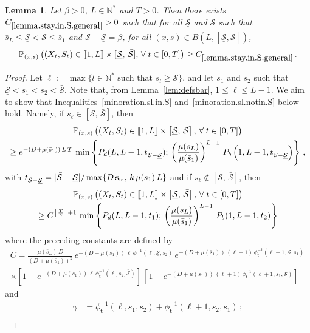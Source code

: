 \documentclass[10pt]{amsart}
\newtheorem{lemm}[theo]{Lemma}\newtheorem{prop}[theo]{Proposition}\newtheorem{coro}[theo]{Corollary}\newtheorem{conj}[theo]{Conjecture}
\theoremstyle{definition}\newtheorem{defi}[theo]{Definition}\newtheorem{rema}[theo]{Remark}\newtheorem{exam}[theo]{Example}\newtheorem{exem}[theo]{Example}\newtheorem{nota}[theo]{Notation}
\newcommand{\llbracket}{\mathopen{[\mkern -2.7mu[}}
\newcommand{\rrbracket}{\mathclose{]\mkern -2.7mu]}}
\newcommand{\PP}{\mathbb{P}}
\newcommand{\NN}{\mathbb{N}}
\newcommand{\Sin}{{\mathbf s}_{\textrm{\tiny\rm in}}}
\newcommand{\Smin}{\underline{\mathcal{S}}}
\newcommand{\Smax}{\bar{\mathcal{S}}}
\newcommand{\barmu}{\mu(\bar s_1)}
\newcommand{\phit}{\phi_\textsf{t}^{-1}}
\newcommand{\setunL}{\llbracket 1, L\rrbracket}
\newcommand{\1}{\mathbf{1}}
\let\oldforall\forall
\renewcommand*{\forall}{\mathrel{\oldforall}}
\begin{document}
\begin{lemm}\label{lemma.stay.in.S.general}
Let $\beta>0$, $L\in\NN^*$ and $T>0$. Then there exists $C_{\ref{lemma.stay.in.S.general}}>0$ such that for all $\Smin$ and $\Smax$ such that $\bar s_L\leq \Smin < \Smax\leq \bar s_1$ and $\Smax-\Smin=\beta$, for all $(x,s) \in B(L,[\Smin,\Smax])$,
\[
\PP_{(x,s)}
\left(\left(X_t,S_t\right) \in \setunL\times [\Smin, \, \Smax],\,
\forall t\in[0,T]\right)\geq C_{\ref{lemma.stay.in.S.general}}\,.
\]
\end{lemm}
\begin{proof}
Let $\ell:= \max\{l \in \NN^* \text{ such that } \bar s_l \geq\Smin\}$, and let $s_1$ and $s_2$ such that $\Smin<s_1<s_2<\Smax$. Note that, from Lemma~\ref{lem:defsbar}, $1\leq \ell \leq L-1$. We aim to show that Inequalities~\eqref{minoration.sl.in.S} and~\eqref{minoration.sl.notin.S} below hold. Namely, if $\bar s_\ell \in [\Smin, \, \Smax]$, then
\begin{multline}\label{minoration.sl.in.S}
\PP_{(x,s)}
\left(\left(X_t,S_t\right) \in \setunL\times \left[\Smin, \, \Smax\right],\,
\forall t\in[0,T]\right)
\\
\geq e^{-(D+\barmu)\,L\,T}\, \min\left\{ P_d(L,L-1, t_{\Smax-\Smin});\,
\left(\frac{\mu(\bar s_L)}{\barmu}\right)^{L-1}\, P_b\left(1,L-1, t_{\Smax-\Smin}\right)
\right\}\,,
\end{multline}
with $t_{\Smax-\Smin}=|\Smax-\Smin|/\max\{D\,\Sin,\, k\,\barmu\,L\}$ and if $\bar s_\ell \notin [\Smin, \, \Smax]$, then
\begin{multline}\label{minoration.sl.notin.S}
\PP_{(x,s)}
\left(\left(X_t,S_t\right) \in \setunL\times \left[\Smin, \, \Smax\right],\,
\forall t\in[0,T]\right)
\\
\geq C^{\left\lfloor\frac{T}{\gamma}\right\rfloor+1}\,
\min\left\{P_d(L,L-1, t_1);\,
\left(\frac{\mu(\bar s_L)}{\barmu}\right)^{L-1}\,P_b(1,L-1, t_2)\right\}
\end{multline}
where the preceding constants are defined by
\begin{multline*}
C =
\frac{\mu(\bar s_L)\,D}{(D+\barmu)^2}\, e^{-(D+\barmu)\,\ell\,\phit(\ell,\Smin,s_2)} \, e^{-(D+\barmu)\,(\ell+1)\,\phit(\ell+1,\Smax,s_1)}\,
\\
\times \left[1-e^{-(D+\barmu)\,\ell\,\phit(\ell,s_2,\Smax)}\right]\,
\left[1- e^{-(D+\barmu)\,(\ell+1)\,\phit\left(\ell+1,s_1,\Smin\right)}\right]\;
\end{multline*}
and
\begin{align*}
\gamma &= \phit(\ell,s_1,s_2)+\phit(\ell+1,s_2,s_1)\,;
\\

\end{align*}
\end{proof}
\end{document}
